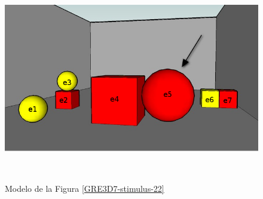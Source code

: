 \begin{figure}[ht]
\begin{minipage}[b]{0.45\linewidth}
\centering
\includegraphics[width=\textwidth]{images/22.jpg}
\vspace*{1cm}
\label{GRE3D7-stimulus-22}
\end{minipage}
\begin{minipage}[b]{0.6\linewidth}
\centering
\\[0pt]
\caption{Modelo de la Figura \ref{GRE3D7-stimulus-22}}
\label{fig-modelo}
\end{minipage}
\end{figure}
%
%
